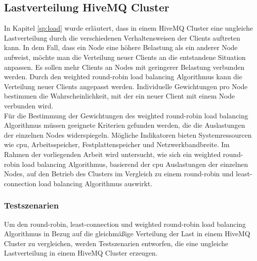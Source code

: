 \subsection{Lastverteilung HiveMQ Cluster} \label{ss:load-distribution}
In Kapitel \ref{sp:load} wurde erläutert, dass in einem HiveMQ Cluster eine ungleiche Lastverteilung durch die verschiedenen Verhaltensweisen der Clients auftreten kann.
In dem Fall, dass ein Node eine höhere Belastung als ein anderer Node aufweist, möchte man die Verteilung neuer Clients an die entstandene Situation anpassen. Es sollen mehr Clients an Nodes mit geringerer Belastung verbunden werden.
Durch den weighted round-robin load balancing Algorithmus kann die Verteilung neuer Clients angepasst werden. Individuelle Gewichtungen pro Node bestimmen die Wahrscheinlichkeit, mit der ein neuer Client mit einem Node verbunden wird.
\\
Für die Bestimmung der Gewichtungen des weighted round-robin load balancing Algorithmus müssen geeignete Kriterien gefunden werden, die die Auslastungen der einzelnen Nodes widerspiegeln.
Mögliche Indikatoren bieten Systemressourcen wie \ac{cpu}, Arbeitsspeicher, Festplattenspeicher und Netzwerkbandbreite.
Im Rahmen der vorliegenden Arbeit wird untersucht, wie sich ein weighted round-robin load balancing Algorithmus, basierend der \ac{cpu} Auslastungen der einzelnen Nodes, auf den Betrieb des Clusters im Vergleich zu einem round-robin und least-connection load balancing Algorithmus auswirkt.

\subsubsection{Testszenarien} \label{ss:test}
Um den round-robin, least-connection und weighted round-robin load balancing Algorithmus in Bezug auf die gleichmä{\ss}ige Verteilung der Last in einem HiveMQ Cluster zu vergleichen, werden Testszenarien entworfen, die eine ungleiche Lastverteilung in einem HiveMQ Cluster erzeugen.

